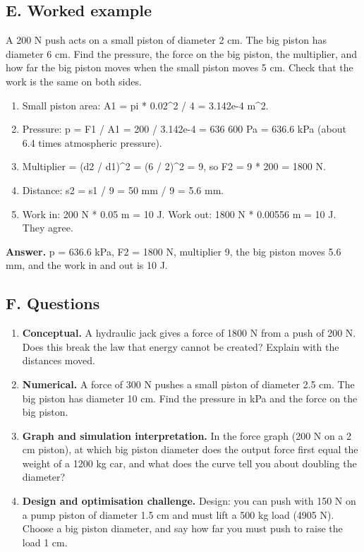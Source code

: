 \documentclass[11pt,a4paper]{article}
\begin{document}
\subsection*{E. Worked example}
A 200 N push acts on a small piston of diameter 2 cm. The big piston has diameter 6 cm. Find the pressure, the force on the big piston, the multiplier, and how far the big piston moves when the small piston moves 5 cm. Check that the work is the same on both sides.
\begin{enumerate}[nosep]
\item Small piston area: A1 = pi * 0.02\textasciicircum{}2 / 4 = 3.142e-4 m\textasciicircum{}2.
\item Pressure: p = F1 / A1 = 200 / 3.142e-4 = 636 600 Pa = 636.6 kPa (about 6.4 times atmospheric pressure).
\item Multiplier = (d2 / d1)\textasciicircum{}2 = (6 / 2)\textasciicircum{}2 = 9, so F2 = 9 * 200 = 1800 N.
\item Distance: s2 = s1 / 9 = 50 mm / 9 = 5.6 mm.
\item Work in: 200 N * 0.05 m = 10 J. Work out: 1800 N * 0.00556 m = 10 J. They agree.
\end{enumerate}
\textbf{Answer.} p = 636.6 kPa, F2 = 1800 N, multiplier 9, the big piston moves 5.6 mm, and the work in and out is 10 J.

\subsection*{F. Questions}
\begin{enumerate}[nosep]
\item \textbf{Conceptual.} A hydraulic jack gives a force of 1800 N from a push of 200 N. Does this break the law that energy cannot be created? Explain with the distances moved.
\item \textbf{Numerical.} A force of 300 N pushes a small piston of diameter 2.5 cm. The big piston has diameter 10 cm. Find the pressure in kPa and the force on the big piston.
\item \textbf{Graph and simulation interpretation.} In the force graph (200 N on a 2 cm piston), at which big piston diameter does the output force first equal the weight of a 1200 kg car, and what does the curve tell you about doubling the diameter?
\item \textbf{Design and optimisation challenge.} Design: you can push with 150 N on a pump piston of diameter 1.5 cm and must lift a 500 kg load (4905 N). Choose a big piston diameter, and say how far you must push to raise the load 1 cm.
\end{enumerate}
\end{document}
